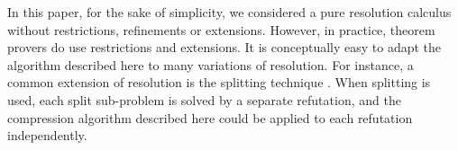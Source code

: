 In this paper, for the sake of simplicity, we considered a pure resolution calculus without restrictions, refinements or extensions. However, in practice, theorem provers do use restrictions and extensions. It is conceptually easy to adapt the algorithm described here to many variations of resolution. 
For instance, a common extension of resolution is the splitting technique \cite{WeidenbachSplitting}. When splitting is used, each split sub-problem is solved by a separate refutation, and the compression algorithm described here could be applied to each refutation independently.








